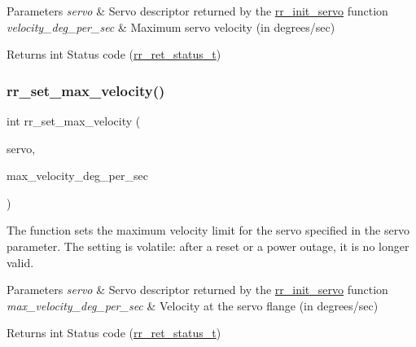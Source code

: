 \begin{DoxyParams}{Parameters}
{\em servo} & Servo descriptor returned by the \hyperlink{group___init_ga0adb313a3eeb8a4399431e940a1f3e9e}{rr\+\_\+init\+\_\+servo} function \\
\hline
{\em velocity\+\_\+deg\+\_\+per\+\_\+sec} & Maximum servo velocity (in degrees/sec) \\
\hline
\end{DoxyParams}
\begin{DoxyReturn}{Returns}
int Status code (\hyperlink{api_8h_a92d5be5038abcf89837faf85a08debdc}{rr\+\_\+ret\+\_\+status\+\_\+t}) 
\end{DoxyReturn}
\mbox{\label{group___config_ga18d5d9dc728f7cb8e7674b9e9b275aca}} 
\subsubsection{\texorpdfstring{rr\+\_\+set\+\_\+max\+\_\+velocity()}{rr\_set\_max\_velocity()}}
{\footnotesize\ttfamily int rr\+\_\+set\+\_\+max\+\_\+velocity (\begin{DoxyParamCaption}\item[{const \hyperlink{structrr__servo__t}{rr\+\_\+servo\+\_\+t} $\ast$}]{servo,  }\item[{const float}]{max\+\_\+velocity\+\_\+deg\+\_\+per\+\_\+sec }\end{DoxyParamCaption})}



The function sets the maximum velocity limit for the servo specified in the \textquotesingle{}servo\textquotesingle{} parameter. The setting is volatile\+: after a reset or a power outage, it is no longer valid. 


\begin{DoxyParams}{Parameters}
{\em servo} & Servo descriptor returned by the \hyperlink{group___init_ga0adb313a3eeb8a4399431e940a1f3e9e}{rr\+\_\+init\+\_\+servo} function \\
\hline
{\em max\+\_\+velocity\+\_\+deg\+\_\+per\+\_\+sec} & Velocity at the servo flange (in degrees/sec) \\
\hline
\end{DoxyParams}
\begin{DoxyReturn}{Returns}
int Status code (\hyperlink{api_8h_a92d5be5038abcf89837faf85a08debdc}{rr\+\_\+ret\+\_\+status\+\_\+t}) 
\end{DoxyReturn}
\mbox{\label{group___config_gab68e78b8a0d2a9ac38b9a72d78acab85}} 
